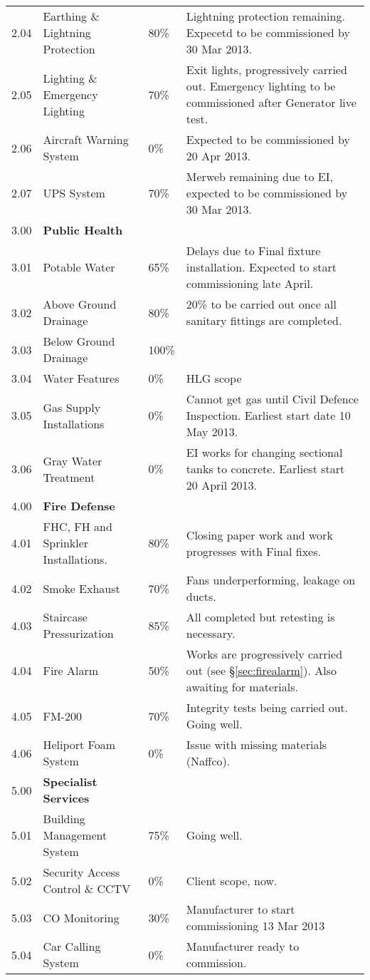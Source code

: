 {\begin{longtable}{lllp{4.3cm}@{}}
2.04	&Earthing \& Lightning Protection &80\%&Lightning protection remaining. Expecetd to be commissioned by 30 Mar 2013.\\		

2.05	&Lighting \& Emergency Lighting  &70\%& Exit lights, progressively carried out. Emergency lighting to be commissioned after Generator live test.\\		

2.06	&Aircraft Warning System &0\%& Expected to be commissioned by 20 Apr 2013.\\	
	
2.07	&UPS System	&70\%&  Merweb remaining due to EI, expected to be commissioned by 30 Mar 2013.\\	
\midrule
3.00	&\textbf{Public Health}		&&\\
3.01	&Potable Water	&65\%& Delays due to Final fixture installation. Expected to start commissioning late April.\\	

3.02	&Above Ground Drainage &80\%&20\% to be carried out once all sanitary fittings are completed.\\		
3.03	&Below Ground Drainage  &100\%&\\		
3.04	&Water Features	     &0\%& HLG scope\\	
3.05	&Gas Supply Installations	&0\%& Cannot get gas until Civil Defence Inspection. Earliest start date 10 May 2013.\\	
3.06  & Gray Water Treatment &0\% &EI works for changing sectional tanks to concrete. Earliest start 20 April 2013.  \\
\midrule		
4.00	&\textbf{Fire Defense} &&\\	
4.01	&FHC, FH and Sprinkler Installations.	&80\%&Closing paper work and work progresses with Final fixes.\\	
4.02	&Smoke Exhaust		&70\%&Fans underperforming, leakage on ducts. \\
4.03	&Staircase Pressurization          &85\%&All completed but retesting is necessary.\\		
4.04	&Fire Alarm		&50\%& Works are progressively carried out (see \S\ref{sec:firealarm}). Also awaiting for materials.\\

4.05	&FM-200		&70\%&Integrity tests being carried out. Going well. \\

4.06	&Heliport Foam System	 &0\%&Issue with missing materials (Naffco).\\	
\midrule
5.00	&\textbf{Specialist Services}		&&\\
5.01	&Building Management System	&75\%& Going well.\\	
5.02	&Security Access Control \& CCTV	&0\%&Client scope, now.\\	
5.03	&CO Monitoring		& 30\%&Manufacturer to start commissioning 13 Mar 2013 \\
5.04	&Car Calling System		&0\%&Manufacturer ready to commission.\\


\end{longtable}}
